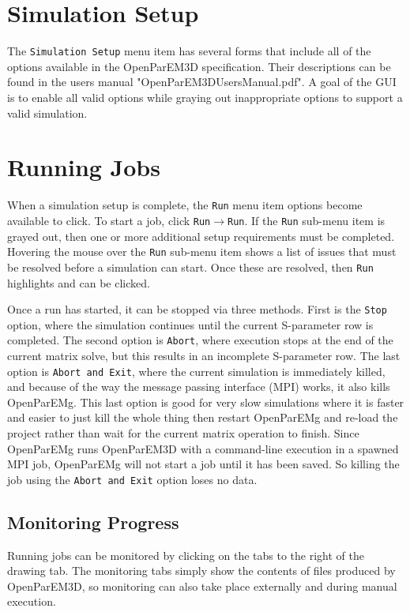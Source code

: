 \documentclass[titlepage]{article}
\renewcommand\_{\textunderscore\linebreak[1]}
\begin{document}
\section{Simulation Setup}

The \texttt{Simulation Setup} menu item has several forms that include all of the options available in the OpenParEM3D specification.  Their descriptions can be found in the users manual "OpenParEM3D\_Users\_Manual.pdf".  A goal of the GUI is to enable all valid options while graying out inappropriate options to support a valid simulation. 

\section{Running Jobs}

When a simulation setup is complete, the \texttt{Run} menu item options become available to click.  To start a job, click \texttt{Run}$\rightarrow$\texttt{Run}.  If the \texttt{Run} sub-menu item is grayed out, then one or more additional setup requirements must be completed.  Hovering the mouse over the \texttt{Run} sub-menu item shows a list of issues that must be resolved before a simulation can start.  Once these are resolved, then \texttt{Run} highlights and can be clicked.

Once a run has started, it can be stopped via three methods.  First is the \texttt{Stop} option, where the simulation continues until the current S-parameter row is completed.  The second option is \texttt{Abort}, where execution stops at the end of the current matrix solve, but this results in an incomplete S-parameter row.  The last option is \texttt{Abort and Exit}, where the current simulation is immediately killed, and because of the way the message passing interface (MPI) works, it also kills OpenParEMg.   This last option is good for very slow simulations where it is faster and easier to just kill the whole thing then restart OpenParEMg and re-load the project rather than wait for the current matrix operation to finish.
Since OpenParEMg runs OpenParEM3D with a command-line execution in a spawned MPI job, OpenParEMg will not start a job until it has been saved.  So killing the job using the \texttt{Abort and Exit} option loses no data.

\subsection{Monitoring Progress}

Running jobs can be monitored by clicking on the tabs to the right of the drawing tab.  The monitoring tabs simply show the contents of files produced by OpenParEM3D, so monitoring can also take place externally and during manual execution.
\end{document}
